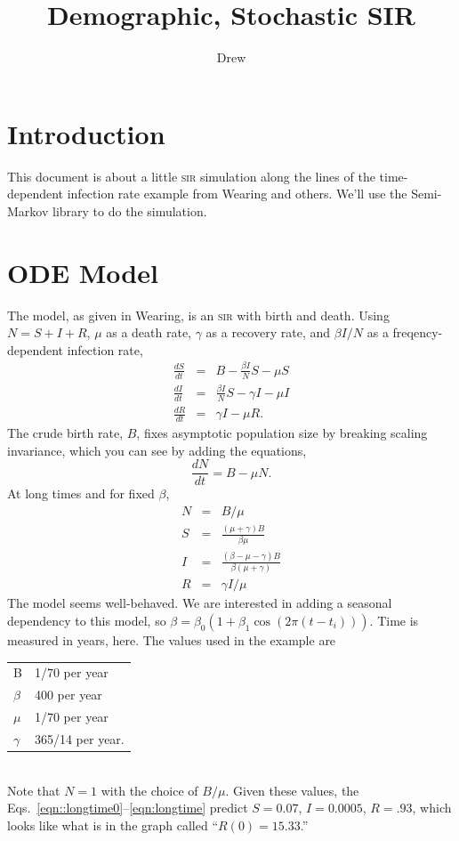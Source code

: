 \documentclass{article}
\title{Demographic, Stochastic SIR}
\author{Drew}
\newcommand{\sir}{\textsc{sir}\xspace}
\begin{document}
\maketitle

\section{Introduction}
This document is about a little \sir simulation along the lines of the
time-dependent infection rate example from Wearing and others\cite{Wearing2012}.
We'll use the Semi-Markov library\cite{SemiMarkov2014} to do the simulation.

\section{ODE Model}
The model, as given in Wearing, is an \sir with birth and death.
Using $N=S+I+R$, $\mu$ as a death rate, $\gamma$ as a recovery rate,
and $\beta I/N$ as a freqency-dependent infection rate,
\begin{eqnarray}
  \frac{dS}{dt}&=& B - \frac{\beta I}{N}S-\mu S \\
  \frac{dI}{dt}&=& \frac{\beta I}{N}S-\gamma I-\mu I \\
  \frac{dR}{dt}&=& \gamma I - \mu R.
\end{eqnarray}
The crude birth rate, $B$, fixes asymptotic population size by breaking
scaling invariance, which you can see by adding the equations,
\begin{equation}
  \frac{dN}{dt}=B-\mu N.
\end{equation}
At long times and for fixed $\beta$,
\begin{eqnarray}
  N & = & B/\mu \label{eqn::longtime0}\\
  S & = & \frac{(\mu+\gamma)B}{\beta \mu} \\
  I & = & \frac{(\beta-\mu-\gamma)B}{\beta(\mu+\gamma)} \\
  R & = & \gamma I/\mu\label{eqn:longtime}
\end{eqnarray}
The model seems well-behaved. We are interested in adding a seasonal
dependency to this model, so $\beta=\beta_0(1+\beta_1 \cos(2\pi (t-t_i))).$
Time is measured in years, here. The values used in the example
are \\
\begin{tabular}{ll}
B & 1/70 per year \\
$\beta$ & 400 per year \\
$\mu$ & 1/70 per year \\
$\gamma$ & 365/14 per year.
\end{tabular} \\
Note that $N=1$ with the choice of $B/\mu$. Given these values, the
Eqs.~\ref{eqn::longtime0}--\ref{eqn:longtime} predict
$S=0.07$, $I=0.0005$, $R=.93$, which looks like what is in the graph
called ``$R(0)=15.33$.''
\end{document}

